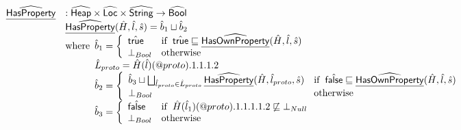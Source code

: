 \documentclass{article}
\makeatletter
\newcommand{\SF}[1]{\mbox{\textsf{#1}}}
\newcommand{\wherec}[1]{{\rm where}\begin{array}[t]{l}#1\end{array}}
\newcommand{\ifc}[1]{{\rm if}\begin{array}[t]{l}#1\end{array}}
\newcommand{\owc}{{\rm otherwise}}
\newcommand{\abs}[1]{\widehat{\SF{#1}}}
\newcommand{\aHeap}{\abs{Heap}}
\newcommand{\aLoc}{\abs{Loc}}
\newcommand{\ahf}[1]{\widehat{\underline{\sf #1}}}
\newcommand{\varprop}[1]{@#1}
\newcommand{\atrue}{\hat{\SF{true}}}
\newcommand{\afalse}{\hat{\SF{false}}}
\makeatother
\begin{document}
\[
\begin{array}{ll}

\ahf{HasProperty} & : \aHeap \times \aLoc \times \abs{String} \rightarrow \abs{Bool} \\
& \ahf{HasProperty}(\hat{H},\hat{l},\hat{s}) = \hat{b}_1\sqcup\hat{b}_2 \\
& \wherec{
  \hat{b}_1 = \left\{
    \begin{array}{ll}
      \atrue & \ifc{\atrue\sqsubseteq\ahf{HasOwnProperty}(\hat{H},\hat{l},\hat{s})} \\
      \bot_{Bool} & \owc \\
    \end{array}
    \right.\\
    \hat{L}_{proto} = \hat{H}(\hat{l})(\varprop{proto}).1.1.1.2 \\
  \hat{b}_2 = \left\{
    \begin{array}{ll}
      \hat{b}_3 \sqcup \bigsqcup_{\hat{l}_{proto}\in\hat{L}_{proto}}\ahf{HasProperty}(\hat{H},\hat{l}_{proto},\hat{s})
      & \ifc{\afalse\sqsubseteq\ahf{HasOwnProperty}(\hat{H},\hat{l},\hat{s})} \\
      \bot_{Bool} & \owc \\
    \end{array}
    \right.\\
    \hat{b}_3 =
    \left\{
      \begin{array}{ll}
        \afalse & \ifc{\hat{H}(\hat{l}_1)(\varprop{proto}).1.1.1.1.2 \not\sqsubseteq \bot_{Null}}\\
        \bot_{Bool} & \owc\\
      \end{array}
    \right.\\
  }\\
\\


\end{array}\]
\end{document}
